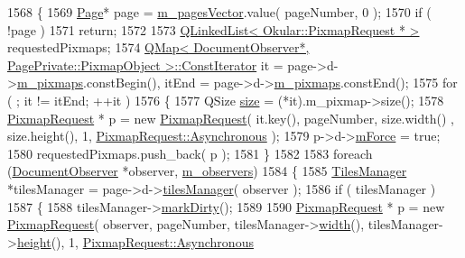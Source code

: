 \begin{DoxyCode}
1568 \{
1569     \hyperlink{classOkular_1_1Page}{Page}* page = \hyperlink{classOkular_1_1DocumentPrivate_a73b852d9a73ffe8061b66dbf9b290f17}{m\_pagesVector}.value( pageNumber, 0 );
1570     \textcolor{keywordflow}{if} ( !page )
1571         \textcolor{keywordflow}{return};
1572 
1573     \hyperlink{classQLinkedList}{QLinkedList< Okular::PixmapRequest * >} requestedPixmaps;
1574     \hyperlink{classQMap}{QMap< DocumentObserver*, PagePrivate::PixmapObject >::ConstIterator}
       it = page->d->\hyperlink{classOkular_1_1PagePrivate_aa24cb69b4eb47c8798c1b06a88f93b6c}{m\_pixmaps}.constBegin(), itEnd = page->d->\hyperlink{classOkular_1_1PagePrivate_aa24cb69b4eb47c8798c1b06a88f93b6c}{m\_pixmaps}.constEnd();
1575     \textcolor{keywordflow}{for} ( ; it != itEnd; ++it )
1576     \{
1577         QSize \hyperlink{synctex__parser_8c_aa23c661441688350614bd6a350d2b6ff}{size} = (*it).m\_pixmap->size();
1578         \hyperlink{classOkular_1_1PixmapRequest}{PixmapRequest} * p = \textcolor{keyword}{new} \hyperlink{classOkular_1_1PixmapRequest}{PixmapRequest}( it.key(), pageNumber, size.width()
      , size.height(), 1, \hyperlink{classOkular_1_1PixmapRequest_a34c6774277612c3af3743fdd44ab0cbaa1c086a3111f9332b7a0b6d8ff0ab967f}{PixmapRequest::Asynchronous} );
1579         p->d->\hyperlink{classOkular_1_1PixmapRequestPrivate_acf386d17b15b2fbbeac1046a87cc487f}{mForce} = \textcolor{keyword}{true};
1580         requestedPixmaps.push\_back( p );
1581     \}
1582 
1583     \textcolor{keywordflow}{foreach} (\hyperlink{classOkular_1_1DocumentObserver}{DocumentObserver} *observer, \hyperlink{classOkular_1_1DocumentPrivate_a604d83cdce56b4cab8d2bcccfc01fbfa}{m\_observers})
1584     \{
1585         \hyperlink{classOkular_1_1TilesManager}{TilesManager} *tilesManager = page->d->\hyperlink{classOkular_1_1PagePrivate_a8eec394b8e7492196e204812d82e89c6}{tilesManager}( observer );
1586         \textcolor{keywordflow}{if} ( tilesManager )
1587         \{
1588             tilesManager->\hyperlink{classOkular_1_1TilesManager_a53e88f49cd72c8a42e3c4688cce45225}{markDirty}();
1589 
1590             \hyperlink{classOkular_1_1PixmapRequest}{PixmapRequest} * p = \textcolor{keyword}{new} \hyperlink{classOkular_1_1PixmapRequest}{PixmapRequest}( observer, pageNumber, 
      tilesManager->\hyperlink{classOkular_1_1TilesManager_a88a40f389b20ca54314754aff2392889}{width}(), tilesManager->\hyperlink{classOkular_1_1TilesManager_a4a2fc0597872d6cd291630c2e4bf6986}{height}(), 1, \hyperlink{classOkular_1_1PixmapRequest_a34c6774277612c3af3743fdd44ab0cbaa1c086a3111f9332b7a0b6d8ff0ab967f}{PixmapRequest::Asynchronous} 

\end{DoxyCode}
